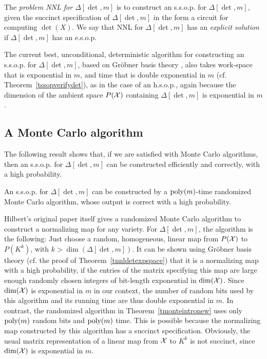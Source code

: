 \documentclass[11pt]{article}
\begin{document}
The {\em problem NNL for $\Delta[\det,m]$}
is to construct an  s.s.o.p. for $\Delta[\det,m]$, given
the succinct specification of $\Delta[\det,m]$ in the form  a circuit 
for computing $\det(X)$.
We say that  NNL for $\Delta[\det,m]$ has an {\em explicit solution} if $\Delta[\det,m]$ has an e.s.o.p.


The current best, unconditional,
deterministic algorithm for constructing an s.s.o.p. for $\Delta[\det,m]$, 
based on  Gr\"obner basis theory \cite{mayr2},
also takes work-space  that is exponential in $m$, and time that is double exponential
in $m$ (cf. Theorem~\ref{tssopverifydet}),  as in the case of an h.s.o.p., again because 
the dimension of the ambient space $P({\cal X})$ containing $\Delta[\det,m]$ is exponential in $m$.

\subsection{A Monte Carlo algorithm} \label{smonteintro}
The following result shows that, if we are satisfied with Monte Carlo algorithms, then
an s.s.o.p. for $\Delta[\det,m]$ can be constructed efficiently and correctly, with a high probability.

\begin{theorem} \label{tmonteintronew}
An s.s.o.p. for $\Delta[\det,m]$ can be constructed  by  a ${\mbox {poly}}(m)$-time randomized 
Monte Carlo algorithm, whose output is correct with a high probability.
\end{theorem} 


Hilbert's original paper \cite{hilbert} itself gives a randomized Monte Carlo algorithm
to construct a normalizing map for any variety. For $\Delta[\det,m]$, the algorithm is the following: Just choose 
a random, homogeneous, linear map from $P({\cal X})$ to $P(K^k)$, with $k>\dim(\Delta[\det,m])$. 
It can be shown using  Gr\"obner basis theory \cite{mayr2} (cf. the proof of Theorem~\ref{tnnldetexpspace}) that
it  is a normalizing map with a high probability,
if  the entries of the matrix specifying this map are large enough
randomly chosen  integers of  bit-length exponential  in $\dim({\cal X})$.
Since $\dim({\cal X})$  is exponential
in $m$ in our context, the number of random bits used by this algorithm and 
its running time are thus double exponential in $m$. 
In contrast, the randomized algorithm in Theorem~\ref{tmonteintronew}
uses  only ${\mbox {poly}}(m)$ random bits  and  ${\mbox {poly}}(m)$ time. This is possible because the normalizing
map constructed by this algorithm has a succinct specification.
Obviously, the usual matrix representation 
of a linear map from ${\cal X}$ to $K^k$ is not succinct,  since
$\dim({\cal X})$ is  exponential in $m$.
\end{document}

